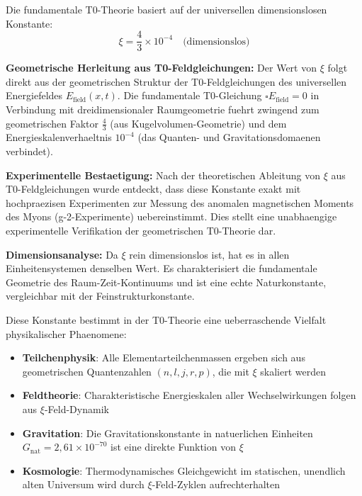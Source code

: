 \documentclass[12pt,a4paper]{article}
\begin{document}
	Die fundamentale T0-Theorie basiert auf der universellen dimensionslosen Konstante:
	\begin{equation}
		\xi = \frac{4}{3} \times 10^{-4} \quad \text{(dimensionslos)}
	\end{equation}
	
	\textbf{Geometrische Herleitung aus T0-Feldgleichungen:} Der Wert von $\xi$ folgt direkt aus der geometrischen Struktur der T0-Feldgleichungen des universellen Energiefeldes $E_{\text{field}}(x,t)$. Die fundamentale T0-Gleichung $\square E_{\text{field}} = 0$ in Verbindung mit dreidimensionaler Raumgeometrie fuehrt zwingend zum geometrischen Faktor $\frac{4}{3}$ (aus Kugelvolumen-Geometrie) und dem Energieskalenverhaeltnis $10^{-4}$ (das Quanten- und Gravitationsdomaenen verbindet).
	
	\textbf{Experimentelle Bestaetigung:} Nach der theoretischen Ableitung von $\xi$ aus T0-Feldgleichungen wurde entdeckt, dass diese Konstante exakt mit hochpraezisen Experimenten zur Messung des anomalen magnetischen Moments des Myons (g-2-Experimente) uebereinstimmt. Dies stellt eine unabhaengige experimentelle Verifikation der geometrischen T0-Theorie dar.
	
	\textbf{Dimensionsanalyse:} Da $\xi$ rein dimensionslos ist, hat es in allen Einheitensystemen denselben Wert. Es charakterisiert die fundamentale Geometrie des Raum-Zeit-Kontinuums und ist eine echte Naturkonstante, vergleichbar mit der Feinstrukturkonstante.
	
	Diese Konstante bestimmt in der T0-Theorie eine ueberraschende Vielfalt physikalischer Phaenomene:
	\begin{itemize}
		\item \textbf{Teilchenphysik}: Alle Elementarteilchenmassen ergeben sich aus geometrischen Quantenzahlen $(n,l,j,r,p)$, die mit $\xi$ skaliert werden
		\item \textbf{Feldtheorie}: Charakteristische Energieskalen aller Wechselwirkungen folgen aus $\xi$-Feld-Dynamik
		\item \textbf{Gravitation}: Die Gravitationskonstante in natuerlichen Einheiten $G_{\text{nat}} = 2{,}61 \times 10^{-70}$ ist eine direkte Funktion von $\xi$
		\item \textbf{Kosmologie}: Thermodynamisches Gleichgewicht im statischen, unendlich alten Universum wird durch $\xi$-Feld-Zyklen aufrechterhalten
	\end{itemize}
	
\end{document}
